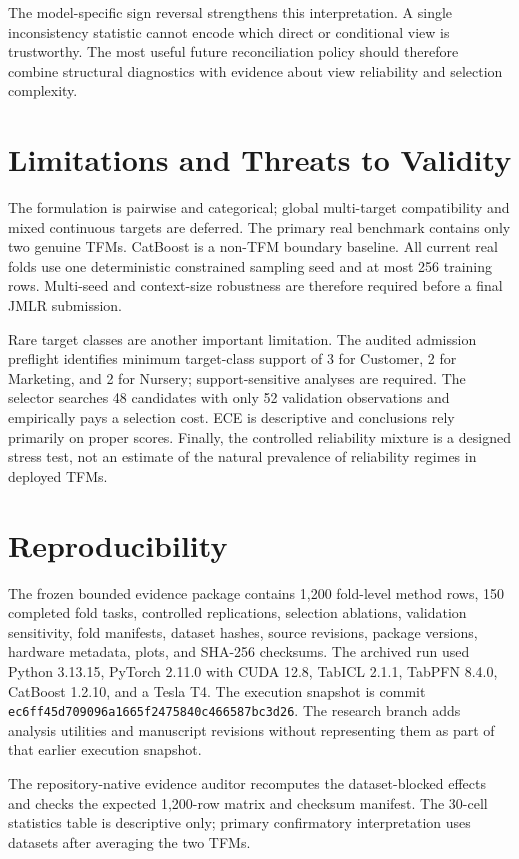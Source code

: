 \documentclass[twoside,11pt]{article}
\begin{document}
The model-specific sign reversal strengthens this interpretation. A single inconsistency statistic cannot encode which direct or conditional view is trustworthy. The most useful future reconciliation policy should therefore combine structural diagnostics with evidence about view reliability and selection complexity.

\section{Limitations and Threats to Validity}
The formulation is pairwise and categorical; global multi-target compatibility and mixed continuous targets are deferred. The primary real benchmark contains only two genuine TFMs. CatBoost is a non-TFM boundary baseline. All current real folds use one deterministic constrained sampling seed and at most 256 training rows. Multi-seed and context-size robustness are therefore required before a final JMLR submission.

Rare target classes are another important limitation. The audited admission preflight identifies minimum target-class support of 3 for Customer, 2 for Marketing, and 2 for Nursery; support-sensitive analyses are required. The selector searches 48 candidates with only 52 validation observations and empirically pays a selection cost. ECE is descriptive and conclusions rely primarily on proper scores. Finally, the controlled reliability mixture is a designed stress test, not an estimate of the natural prevalence of reliability regimes in deployed TFMs.

\section{Reproducibility}
The frozen bounded evidence package contains 1,200 fold-level method rows, 150 completed fold tasks, controlled replications, selection ablations, validation sensitivity, fold manifests, dataset hashes, source revisions, package versions, hardware metadata, plots, and SHA-256 checksums. The archived run used Python 3.13.15, PyTorch 2.11.0 with CUDA 12.8, TabICL 2.1.1, TabPFN 8.4.0, CatBoost 1.2.10, and a Tesla T4. The execution snapshot is commit \texttt{ec6ff45d709096a1665f2475840c466587bc3d26}. The research branch adds analysis utilities and manuscript revisions without representing them as part of that earlier execution snapshot.

The repository-native evidence auditor recomputes the dataset-blocked effects and checks the expected 1,200-row matrix and checksum manifest. The 30-cell statistics table is descriptive only; primary confirmatory interpretation uses datasets after averaging the two TFMs.
\end{document}
